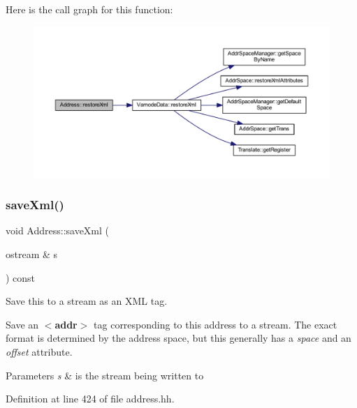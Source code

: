 Here is the call graph for this function\+:
\nopagebreak
\begin{figure}[H]
\begin{center}
\leavevmode
\includegraphics[width=350pt]{class_address_a18a4b4f313eca927ac348a943c886365_cgraph}
\end{center}
\end{figure}
\mbox{\label{class_address_ab483818c0d4947d565828c53ffd3cb4b}} 
\subsubsection{\texorpdfstring{saveXml()}{saveXml()}\hspace{0.1cm}{\footnotesize\ttfamily [1/2]}}
{\footnotesize\ttfamily void Address\+::save\+Xml (\begin{DoxyParamCaption}\item[{ostream \&}]{s }\end{DoxyParamCaption}) const\hspace{0.3cm}{\ttfamily [inline]}}



Save this to a stream as an X\+ML tag. 

Save an {\bfseries{$<$addr$>$}} tag corresponding to this address to a stream. The exact format is determined by the address space, but this generally has a {\itshape space} and an {\itshape offset} attribute. 
\begin{DoxyParams}{Parameters}
{\em s} & is the stream being written to \\
\hline
\end{DoxyParams}


Definition at line 424 of file address.\+hh.

\mbox{\label{class_address_a9369f5ae7596c2aeecfb1a000454b2e5}} 
